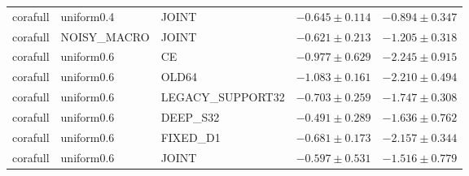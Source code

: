 \begin{longtable}{lllrr}
corafull & uniform0.4 & JOINT & $-0.645 \pm 0.114$ & $-0.894 \pm 0.347$ \\
corafull & NOISY\_MACRO & JOINT & $-0.621 \pm 0.213$ & $-1.205 \pm 0.318$ \\
corafull & uniform0.6 & CE & $-0.977 \pm 0.629$ & $-2.245 \pm 0.915$ \\
corafull & uniform0.6 & OLD64 & $-1.083 \pm 0.161$ & $-2.210 \pm 0.494$ \\
corafull & uniform0.6 & LEGACY\_SUPPORT32 & $-0.703 \pm 0.259$ & $-1.747 \pm 0.308$ \\
corafull & uniform0.6 & DEEP\_S32 & $-0.491 \pm 0.289$ & $-1.636 \pm 0.762$ \\
corafull & uniform0.6 & FIXED\_D1 & $-0.681 \pm 0.173$ & $-2.157 \pm 0.344$ \\
corafull & uniform0.6 & JOINT & $-0.597 \pm 0.531$ & $-1.516 \pm 0.779$ \\
\end{longtable}
